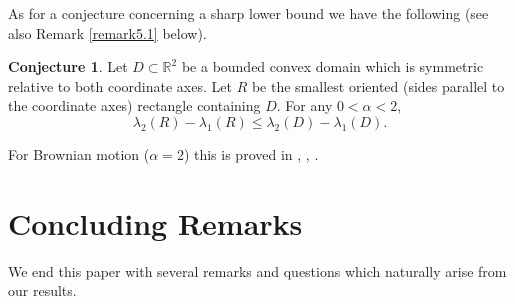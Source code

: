 \documentclass[11pt,leqno]{article}
\theoremstyle{definition}
\newtheorem{conj}{Conjecture}[section]
\newcommand{\Rt}{\mathbb{R}^2}
\numberwithin{equation}{section}
\begin{document}
As for a conjecture concerning a sharp lower bound we have the following (see also Remark
\ref{remark5.1} below).

\begin{conj}
Let $D\subset \Rt$ be a bounded convex domain which is symmetric relative to both
coordinate  axes.  Let $R$ be the smallest oriented (sides parallel to the coordinate axes) rectangle
containing $D$.  For any $0<\alpha<2$,
\begin{equation}
\lambda_2(R) - \lambda_1(R) \leq \lambda_2(D) - \lambda_1(D).
\end{equation}
\end{conj}

For  Brownian motion ($\alpha=2$) this is proved in \cite{BKr}, \cite{BM}, \cite{Da}.
\section{Concluding Remarks}

We end this paper with several remarks and questions  which 
naturally arise from our results. 
\end{document}
